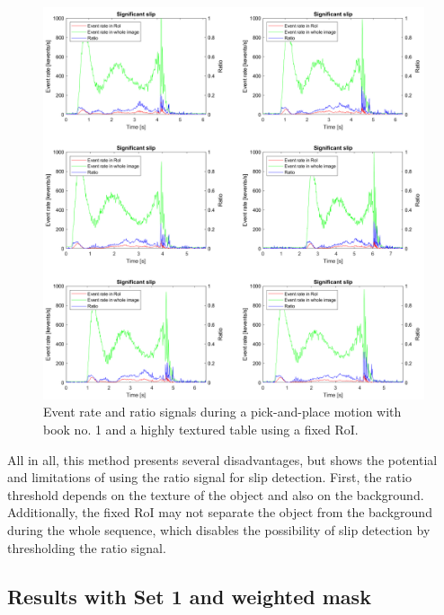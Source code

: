 \begin{figure}[h]
    \centering
    \includegraphics[width=\textwidth]{resources/images/fix_roi_book1_tt}
    \caption{Event rate and ratio signals during a pick-and-place motion with book no. 1 and a highly textured table using a fixed RoI.}\label{fig:fix_roi_book1_tt}
\end{figure}

All in all, this method presents several disadvantages, but shows the potential and limitations of using the ratio signal for slip detection. First, the ratio threshold depends on the texture of the object and also on the background. Additionally, the fixed RoI may not separate the object from the background during the whole sequence, which disables the possibility of slip detection by thresholding the ratio signal.

\subsection{Results with Set 1 and weighted mask}

